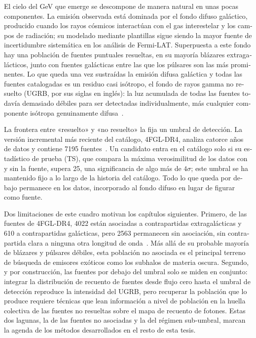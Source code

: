 \begin{otherlanguage}{spanish}
El cielo del GeV que emerge se descompone de manera natural en unas pocas componentes. La emisión observada está dominada por el fondo difuso galáctico, producido cuando los rayos cósmicos interactúan con el gas interestelar y los campos de radiación; su modelado mediante plantillas sigue siendo la mayor fuente de incertidumbre sistemática en los análisis de Fermi-LAT. Superpuesta a este fondo hay una población de fuentes puntuales resueltas, en su mayoría blázares extragalácticos, junto con fuentes galácticas entre las que los púlsares son las más prominentes. Lo que queda una vez sustraídas la emisión difusa galáctica y todas las fuentes catalogadas es un residuo casi isótropo, el fondo de rayos gamma no resuelto (UGRB, por sus siglas en inglés): la luz acumulada de todas las fuentes todavía demasiado débiles para ser detectadas individualmente, más cualquier componente isótropa genuinamente difusa~\cite{Fermi-LAT:2014ryh}.

La frontera entre «resuelto» y «no resuelto» la fija un umbral de detección. La versión incremental más reciente del catálogo, 4FGL-DR4, analiza catorce años de datos y contiene 7195 fuentes~\cite{Ballet:2023qzs}. Un candidato entra en el catálogo solo si su estadístico de prueba (TS), que compara la máxima verosimilitud de los datos con y sin la fuente, supera 25, una significancia de algo más de $4\sigma$; este umbral se ha mantenido fijo a lo largo de la historia del catálogo. Todo lo que queda por debajo permanece en los datos, incorporado al fondo difuso en lugar de figurar como fuente.

Dos limitaciones de este cuadro motivan los capítulos siguientes. Primero, de las fuentes de 4FGL-DR4, 4022 están asociadas a contrapartidas extragalácticas y 610 a contrapartidas galácticas, pero 2563 permanecen sin asociación, sin contrapartida clara a ninguna otra longitud de onda~\cite{Ballet:2023qzs}. Más allá de su probable mayoría de blázares y púlsares débiles, esta población no asociada es el principal terreno de búsqueda de emisores exóticos como los subhalos de materia oscura. Segundo, y por construcción, las fuentes por debajo del umbral solo se miden en conjunto: integrar la distribución de recuento de fuentes desde flujo cero hasta el umbral de detección reproduce la intensidad del UGRB, pero recuperar la población que lo produce requiere técnicas que lean información a nivel de población en la huella colectiva de las fuentes no resueltas sobre el mapa de recuento de fotones. Estas dos lagunas, la de las fuentes no asociadas y la del régimen sub-umbral, marcan la agenda de los métodos desarrollados en el resto de esta tesis.


\end{otherlanguage}
